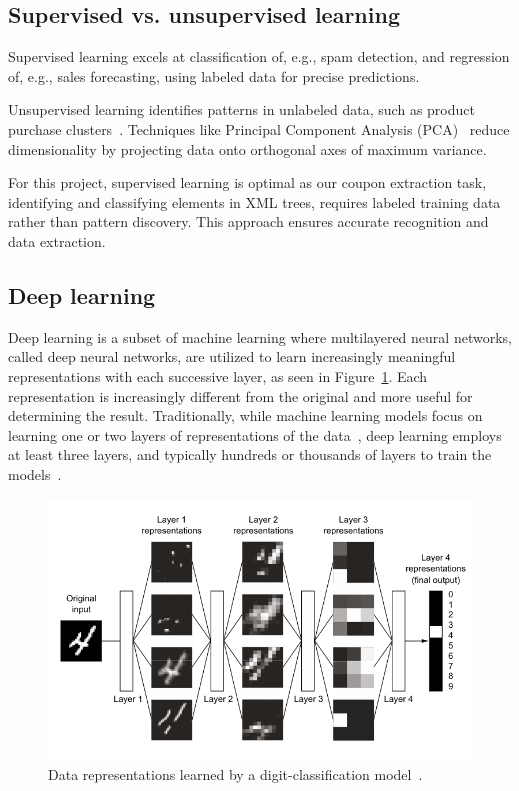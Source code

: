 \documentclass[licencjacka,en]{pracamgr}
\begin{document}
\subsection{Supervised vs. unsupervised learning}
Supervised learning excels at classification of, e.g., spam detection, and regression of, e.g., sales forecasting, using labeled data for precise predictions.

Unsupervised learning identifies patterns in unlabeled data, such as product purchase clusters~\cite{supervised_ibm}. Techniques like Principal Component Analysis (PCA)~\cite{PCA} reduce dimensionality by projecting data onto orthogonal axes of maximum variance.

For this project, supervised learning is optimal as our coupon extraction task, identifying and classifying elements in XML trees, requires labeled training data rather than pattern discovery. This approach ensures accurate recognition and data extraction.

\subsection{Deep learning}
Deep learning is a subset of machine learning where multilayered neural networks, called deep neural networks, are utilized to learn increasingly meaningful representations with each successive layer, as seen in Figure~\ref{fig:nn_simple}. Each representation is increasingly different from the original and more useful for determining the result. Traditionally, while machine learning models focus on learning one or two layers of representations of the data~\cite{francuz_8}, deep learning employs at least three layers, and typically hundreds or thousands of layers to train the models~\cite{ibm_dl}.

\begin{figure}
    \centering
    \includegraphics[width=0.5\linewidth]{bachelor_images/nn_simple.png}
    \caption{Data representations learned by a digit-classification model~\cite{francuz_8}.}
    \label{fig:nn_simple}
\end{figure}
\end{document}
